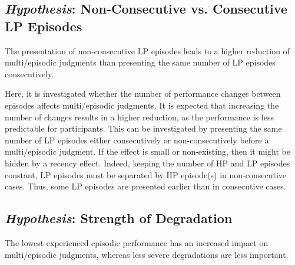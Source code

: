 \subsection[H3: Non-Consecutive vs. Consecutive \acs{LP} Episodes]{\emph{Hypothesis}: Non-Consecutive vs. Consecutive \acs{LP} Episodes}
\begin{hypothesis}\label{hypo:consecutive}
The presentation of non-consecutive \ac{LP} episodes leads to a higher reduction of multi\-/episodic judgments than presenting the same number of \ac{LP} episodes consecutively.
\end{hypothesis}

Here, it is investigated whether the number of performance changes between episodes affects multi\-/episodic judgments.
It is expected that increasing the number of changes results in a higher reduction, as the performance is less predictable for participants.
This can be investigated by presenting the same number of \ac{LP} episodes either consecutively or non-consecutively before a multi\-/episodic judgment.
If the effect is small or non-existing, then it might be hidden by a recency effect.
Indeed, keeping the number of \ac{HP} and \ac{LP} episodes constant, \ac{LP} episodes must be separated by \ac{HP} episode(s) in non-consecutive cases.
Thus, some \ac{LP} episodes are presented earlier than in consecutive cases.

\subsection[H4: Strength of Degradation]{\emph{Hypothesis}: Strength of Degradation}
\begin{hypothesis}\label{hypo:strength}
The lowest experienced episodic performance has an increased impact on multi\-/episodic judgments, whereas less severe degradations are less important.
\end{hypothesis}

